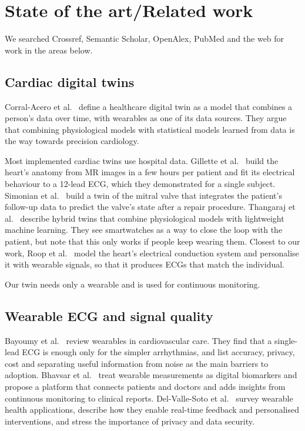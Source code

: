 \chapter{State of the art/Related work}
\label{chapter:stateOfArt}

We searched Crossref, Semantic Scholar, OpenAlex, PubMed and the web for work in the areas below.

\section{Cardiac digital twins}
\label{sec:rw-twins}

Corral-Acero et al.~\cite{corralacero2020digital} define a healthcare digital twin as a model that combines a person's data over time, with wearables as one of its data sources. They argue that combining physiological models with statistical models learned from data is the way towards precision cardiology.

Most implemented cardiac twins use hospital data. Gillette et al.~\cite{gillette2021framework} build the heart's anatomy from MR images in a few hours per patient and fit its electrical behaviour to a 12-lead ECG, which they demonstrated for a single subject. Simonian et al.~\cite{simonian2025development} build a twin of the mitral valve that integrates the patient's follow-up data to predict the valve's state after a repair procedure. Thangaraj et al.~\cite{thangaraj2024cardiovascular} describe hybrid twins that combine physiological models with lightweight machine learning. They see smartwatches as a way to close the loop with the patient, but note that this only works if people keep wearing them. Closest to our work, Roop et al.~\cite{roop2025tuning} model the heart's electrical conduction system and personalise it with wearable signals, so that it produces ECGs that match the individual.

Our twin needs only a wearable and is used for continuous monitoring.

\section{Wearable ECG and signal quality}
\label{sec:rw-wearables}

Bayoumy et al.~\cite{bayoumy2021smart} review wearables in cardiovascular care. They find that a single-lead ECG is enough only for the simpler arrhythmias, and list accuracy, privacy, cost and separating useful information from noise as the main barriers to adoption. Bhavsar et al.~\cite{bhavsar2021digital} treat wearable measurements as digital biomarkers and propose a platform that connects patients and doctors and adds insights from continuous monitoring to clinical reports. Del-Valle-Soto et al.~\cite{delvallesoto2024unveiling} survey wearable health applications, describe how they enable real-time feedback and personalised interventions, and stress the importance of privacy and data security.

